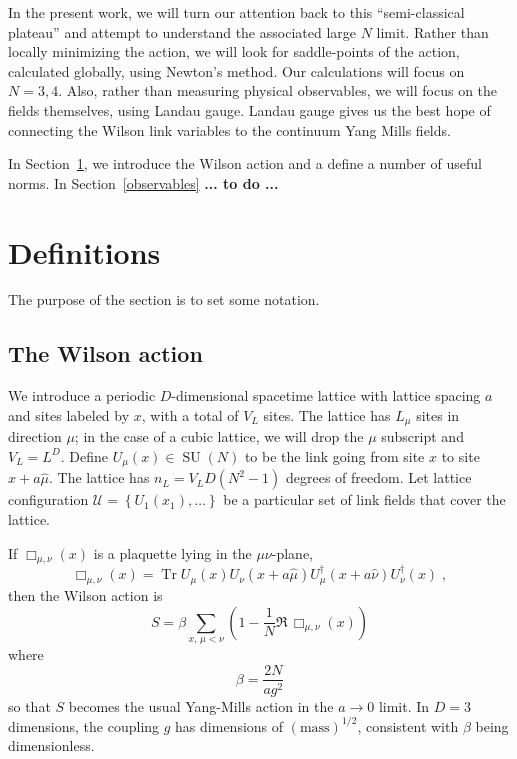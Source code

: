 \documentclass[preprint,aps,prd]{revtex4-2}
\newcommand{\da}{\dagger}  %
\newcommand{\be}{\begin{equation}}
\newcommand{\eq}{\end{equation}}
\newcommand{\plaquette}{\Box}
\newcommand{\config}{\mathcal{U}}
\DeclareMathOperator{\SU}{SU}
\DeclareMathOperator{\Tr}{Tr}
\begin{document}
In the present work, we will turn our attention back
to this ``semi-classical plateau'' and attempt to understand
the associated large $N$ limit.  Rather than locally
minimizing the action, we will look for saddle-points of
the action, calculated globally, using Newton's method.
Our calculations will focus on $N=3,4$.
Also, rather than measuring physical observables, we will focus
on the fields themselves, using Landau gauge.
Landau gauge gives us the best hope
of connecting the Wilson link variables to the continuum
Yang Mills fields.

In Section~\ref{def}, we introduce the Wilson action and
a define a number of useful norms.  In Section~\ref{observables}
{\bf ...  to do ...}

\section{Definitions}
\label{def}

The purpose of the section is to set some notation.

\subsection{The Wilson action}

We introduce a periodic $D$-dimensional spacetime lattice with lattice
spacing $a$ and sites labeled by $x$, with a total of $V_L$ sites.
The lattice has $L_\mu$ sites in direction $\mu$;
in the case of a cubic lattice, we will drop the $\mu$ subscript
and $V_L = L^D$.
Define $U_\mu(x) \in \SU(N)$ to be the link going from site $x$ to
site $x+a \hat{\mu}$.
The lattice has $n_L=V_L D \left(N^2-1\right)$ degrees of freedom.
Let lattice configuration
$\config=\left\{U_1(x_1),\ldots\right\}$
be a particular set of link fields that cover the lattice.

If $\plaquette_{\mu,\nu}(x)$ is a plaquette lying in the $\mu\nu$-plane,
\be
\plaquette_{\mu,\nu}(x) = \Tr U_\mu(x) U_\nu(x+a \hat{\mu})
U_\mu^\da(x+a\hat{\nu}) U_\nu^\da(x) \; ,
\eq
then the Wilson action is
%
\be
S = \beta \sum_{x,\, \mu<\nu} \left(1-\frac{1}{N} \Re\, \plaquette_{\mu,\nu}(x)\right) \label{action}
\eq
where
\be
\beta=\frac{2 N}{a g^2}
\eq
so that $S$ becomes the usual Yang-Mills action in the $a\to 0$ limit.
In $D=3$ dimensions, the coupling $g$ has dimensions of
$\left(\mbox{mass}\right)^{1/2}$, consistent with $\beta$ being dimensionless.
\end{document}

